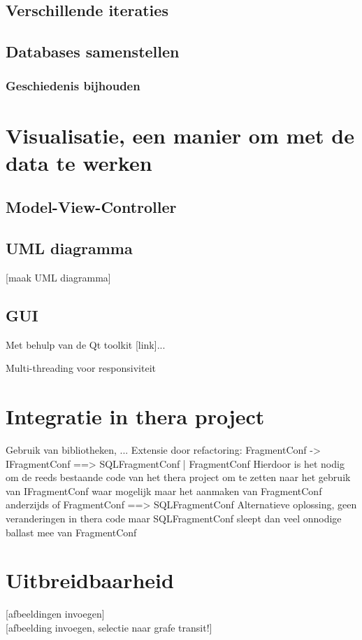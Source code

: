 \subsection{Verschillende iteraties}

\subsection{Databases samenstellen}

\subsubsection{Geschiedenis bijhouden}

\section{Visualisatie, een manier om met de data te werken}

\subsection{Model-View-Controller}

\subsection{UML diagramma}

[maak UML diagramma]\\

\subsection{GUI}
Met behulp van de Qt toolkit [link]...

Multi-threading voor responsiviteit

\section{Integratie in thera project}
Gebruik van bibliotheken, ...
Extensie door refactoring: FragmentConf -> IFragmentConf ==> SQLFragmentConf | FragmentConf
Hierdoor is het nodig om de reeds bestaande code van het thera project om te zetten naar het gebruik van IFragmentConf waar mogelijk maar het aanmaken van FragmentConf anderzijds
of FragmentConf ==> SQLFragmentConf
Alternatieve oplossing, geen veranderingen in thera code maar SQLFragmentConf sleept dan veel onnodige ballast mee van FragmentConf

\section{Uitbreidbaarheid}
[afbeeldingen invoegen]\\


[afbeelding invoegen, selectie naar grafe transit!]\\